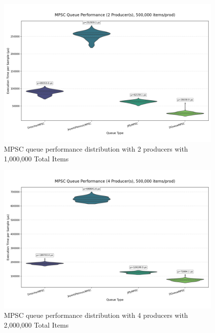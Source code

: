 \begin{figure}[H]
\centering
\caption{MPSC queue performance distribution with 2 producers with 1,000,000 Total Items}
\label{fig:mpsc-violin-2p}
\includegraphics[width=\textwidth]{images/results/mpsc_performance_violin_2_producers.png}
\end{figure}

\begin{figure}[H]
\centering
\caption{MPSC queue performance distribution with 4 producers with 2,000,000 Total Items}
\label{fig:mpsc-violin-4p}
\includegraphics[width=\textwidth]{images/results/mpsc_performance_violin_4_producers.png}
\end{figure}

